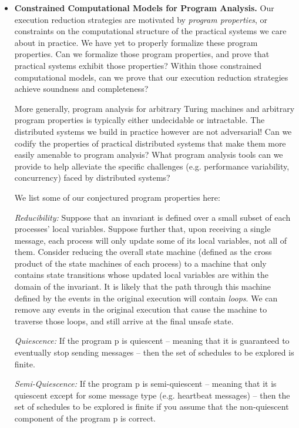 \begin{itemize}

\item \textbf{Constrained Computational Models for Program Analysis.} Our
execution reduction strategies are motivated by
\textit{program properties}, or constraints
on the computational structure of the practical systems we care about in
practice. We have yet to properly formalize these program properties. Can we formalize those program properties, and prove that practical systems exhibit those properties? Within those
constrained computational models, can we prove that our execution reduction
strategies achieve
soundness and completeness?

More generally, program analysis for arbitrary Turing machines and arbitrary program properties
is typically either undecidable or intractable. The distributed systems we build
in practice however are not adversarial! Can we codify the properties of practical
distributed systems that make them more easily
amenable to program analysis? What program analysis tools can we provide to help
alleviate the specific challenges (e.g. performance variability, concurrency) faced
by distributed systems?

We list some of our conjectured program properties here:

\textit{Reducibility:} Suppose that an invariant is defined over a small
subset of each processes' local variables. Suppose further that, upon
receiving a single message, each process will only update some
of its local variables, not all of them. Consider reducing the overall state
machine (defined as the cross product of the
state machines of each process) to a machine that only contains state transitions
whose updated local variables are within the domain of the invariant. It is likely
that the path through this machine defined by the events in the original execution
will contain \textit{loops}. We can remove any events in the original
execution that cause the machine to traverse those loops, and still arrive at
the final unsafe state.

\textit{Quiescence:} If the program p is quiescent -- meaning that it is
guaranteed to eventually stop sending messages -- then the set of schedules to
be explored is finite.

\textit{Semi-Quiescence:} If the program p is semi-quiescent -- meaning that it is quiescent except for
some message type (e.g. heartbeat messages) -- then the set of schedules to be
explored is finite if you assume that the non-quiescent component of the
program p is correct.


\end{itemize}
